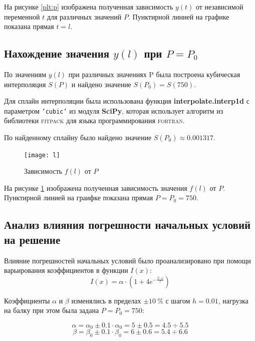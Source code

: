 На рисунке \ref{plt:p} изображена полученная зависимость $y(t)$ от независимой переменной $t$ для различных значений $P$. Пунктирной линией на графике показана прямая $t = l$.

\subsection{Нахождение значения $y(l)$ при $P = P_0$}

По значениям $y(l)$ при различных значениях P была построена кубическая интерполяция $S(P)$ и найдено значение $S(P_0) = S(750)$.

Для сплайн интерполяции была использована функция \textbf{interpolate.interp1d} с параметром \texttt{'cubic'} из модуля \textbf{SciPy}, которая использует алгоритм из библиотеки \textsc{fitpack} для языка программирования \textsc{fortran}.

По найденному сплайну было найдено значение $S(P_0) \approx 0.001317$.

\begin{figure}[H]
\begin{center}
	\vspace{-0.5cm}
	\texttt{[image: l]}
	\caption{Зависимость $f(l)$ от $P$}
	\label{plt:l}
	\vspace{-0.5cm}
\end{center}
\end{figure}

На рисунке \ref{plt:l} изображена полученная зависимость значения $f(l)$ от $P$. Пунктирной линией на граифке показана прямая $P = P_0 = 750$.

\subsection{Анализ влияния погрешности начальных условий на решение}

Влияние погрешностей начальных условий было проанализировано при помощи варьирования коэффициентов в функции $I(x)$:
\begin{equation}\label{eq:var}
I(x) = \alpha \cdot(1 + 4e^{-\frac{\beta\cdot x}{l}})
\end{equation}

Коэффициенты $\alpha$ и $\beta$ изменялись в пределах $\pm 10\ \%$ с шагом $h = 0.01$, нагрузка на балку при этом была задана $P = P_0 = 750$:
\begin{multicols}{2}
\noindent
\[
	\alpha = \alpha_0 \pm 0.1\cdot \alpha_0 = 5 \pm 0.5 = 4.5 \div 5.5
\]
\[
	\beta = \beta_0 \pm 0.1\cdot \beta_0 = 6 \pm 0.6 = 5.4 \div 6.6
\]
\end{multicols}

